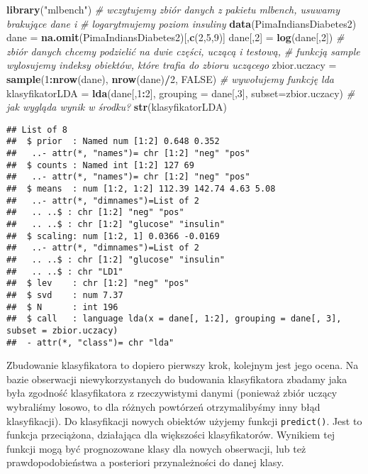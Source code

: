 \documentclass[polish,]{book}
\newenvironment{Shaded}{\begin{snugshade}}{\end{snugshade}}
\newcommand{\CommentTok}[1]{\textcolor[rgb]{0.56,0.35,0.01}{\textit{#1}}}
\newcommand{\DataTypeTok}[1]{\textcolor[rgb]{0.13,0.29,0.53}{#1}}
\newcommand{\DecValTok}[1]{\textcolor[rgb]{0.00,0.00,0.81}{#1}}
\newcommand{\KeywordTok}[1]{\textcolor[rgb]{0.13,0.29,0.53}{\textbf{#1}}}
\newcommand{\NormalTok}[1]{#1}
\newcommand{\OperatorTok}[1]{\textcolor[rgb]{0.81,0.36,0.00}{\textbf{#1}}}
\newcommand{\OtherTok}[1]{\textcolor[rgb]{0.56,0.35,0.01}{#1}}
\newcommand{\StringTok}[1]{\textcolor[rgb]{0.31,0.60,0.02}{#1}}
\begin{document}
\begin{Shaded}
\begin{Highlighting}[]
\KeywordTok{library}\NormalTok{(}\StringTok{"mlbench"}\NormalTok{)}
\CommentTok{# wczytujemy zbiór danych z pakietu mlbench, usuwamy brakujące dane i}
\CommentTok{# logarytmujemy poziom insuliny}
\KeywordTok{data}\NormalTok{(PimaIndiansDiabetes2)}
\NormalTok{dane =}\StringTok{ }\KeywordTok{na.omit}\NormalTok{(PimaIndiansDiabetes2)[,}\KeywordTok{c}\NormalTok{(}\DecValTok{2}\NormalTok{,}\DecValTok{5}\NormalTok{,}\DecValTok{9}\NormalTok{)]}
\NormalTok{dane[,}\DecValTok{2}\NormalTok{] =}\StringTok{ }\KeywordTok{log}\NormalTok{(dane[,}\DecValTok{2}\NormalTok{])}
\CommentTok{# zbiór danych chcemy podzielić na dwie części, uczącą i testową,}
\CommentTok{# funkcją sample wylosujemy indeksy obiektów, które trafia do zbioru uczącego}
\NormalTok{zbior.uczacy =}\StringTok{ }\KeywordTok{sample}\NormalTok{(}\DecValTok{1}\OperatorTok{:}\KeywordTok{nrow}\NormalTok{(dane), }\KeywordTok{nrow}\NormalTok{(dane)}\OperatorTok{/}\DecValTok{2}\NormalTok{, }\OtherTok{FALSE}\NormalTok{)}
\CommentTok{# wywołujemy funkcję lda}
\NormalTok{klasyfikatorLDA =}\StringTok{ }\KeywordTok{lda}\NormalTok{(dane[,}\DecValTok{1}\OperatorTok{:}\DecValTok{2}\NormalTok{], }\DataTypeTok{grouping =}\NormalTok{ dane[,}\DecValTok{3}\NormalTok{], }\DataTypeTok{subset=}\NormalTok{zbior.uczacy)}
\CommentTok{# jak wygląda wynik w środku?}
\KeywordTok{str}\NormalTok{(klasyfikatorLDA)}
\end{Highlighting}
\end{Shaded}

\begin{verbatim}
## List of 8
##  $ prior  : Named num [1:2] 0.648 0.352
##   ..- attr(*, "names")= chr [1:2] "neg" "pos"
##  $ counts : Named int [1:2] 127 69
##   ..- attr(*, "names")= chr [1:2] "neg" "pos"
##  $ means  : num [1:2, 1:2] 112.39 142.74 4.63 5.08
##   ..- attr(*, "dimnames")=List of 2
##   .. ..$ : chr [1:2] "neg" "pos"
##   .. ..$ : chr [1:2] "glucose" "insulin"
##  $ scaling: num [1:2, 1] 0.0366 -0.0169
##   ..- attr(*, "dimnames")=List of 2
##   .. ..$ : chr [1:2] "glucose" "insulin"
##   .. ..$ : chr "LD1"
##  $ lev    : chr [1:2] "neg" "pos"
##  $ svd    : num 7.37
##  $ N      : int 196
##  $ call   : language lda(x = dane[, 1:2], grouping = dane[, 3], subset = zbior.uczacy)
##  - attr(*, "class")= chr "lda"
\end{verbatim}

Zbudowanie klasyfikatora to dopiero pierwszy krok, kolejnym jest jego ocena.
Na bazie obserwacji niewykorzystanych do budowania klasyfikatora zbadamy jaka
była zgodność klasyfikatora z rzeczywistymi danymi (ponieważ zbiór uczący wybraliśmy losowo, to dla różnych powtórzeń otrzymalibyśmy inny błąd klasyfikacji).
Do klasyfikacji nowych obiektów użyjemy funkcji \texttt{predict()}. Jest to funkcja przeciążona, działająca dla większości klasyfikatorów. Wynikiem tej funkcji mogą być
prognozowane klasy dla nowych obserwacji, lub też prawdopodobieństwa a posteriori przynależności do danej klasy.
\end{document}
